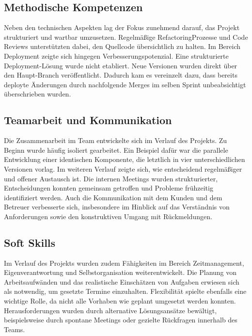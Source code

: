 \documentclass[a4paper,12pt]{article}
\begin{document}
\subsection{Methodische Kompetenzen}

Neben den technischen Aspekten lag der Fokus zunehmend darauf, das Projekt strukturiert und wartbar umzusetzen. Regelmäßige RefactoringProzesse und Code Reviews unterstützten dabei, den Quellcode übersichtlich zu halten. Im Bereich Deployment zeigte sich hingegen Verbesserungspotenzial. Eine strukturierte Deployment-Lösung wurde nicht etabliert. Neue Versionen wurden direkt über den Haupt-Branch veröffentlicht. Dadurch kam es vereinzelt dazu, dass bereits deployte Änderungen durch nachfolgende Merges im selben Sprint unbeabsichtigt überschrieben wurden.

\newpage


\subsection{Teamarbeit und Kommunikation}

Die Zusammenarbeit im Team entwickelte sich im Verlauf des Projekts. Zu Beginn wurde häufig isoliert gearbeitet. Ein Beispiel dafür war die parallele Entwicklung einer identischen Komponente, die letztlich in vier unterschiedlichen Versionen vorlag. Im weiteren Verlauf zeigte sich, wie entscheidend regelmäßiger und offener Austausch ist. Die internen Meetings wurden strukturierter, Entscheidungen konnten gemeinsam getroffen und Probleme frühzeitig identifiziert werden. Auch die Kommunikation mit dem Kunden und dem Betreuer verbesserte sich, insbesondere im Hinblick auf das Verständnis von Anforderungen sowie den konstruktiven Umgang mit Rückmeldungen.


\subsection{Soft Skills}

Im Verlauf des Projekts wurden zudem Fähigkeiten im Bereich Zeitmanagement, Eigenverantwortung und Selbstorganisation weiterentwickelt. Die Planung von Arbeitsaufwänden und das realistische Einschätzen von Aufgaben erwiesen sich als notwendig, um gesetzte Termine einzuhalten. Flexibilität spielte ebenfalls eine wichtige Rolle, da nicht alle Vorhaben wie geplant umgesetzt werden konnten. Herausforderungen wurden durch alternative Lösungsansätze bewältigt, beispielsweise durch spontane Meetings oder gezielte Rückfragen innerhalb des Teams.
\end{document}
